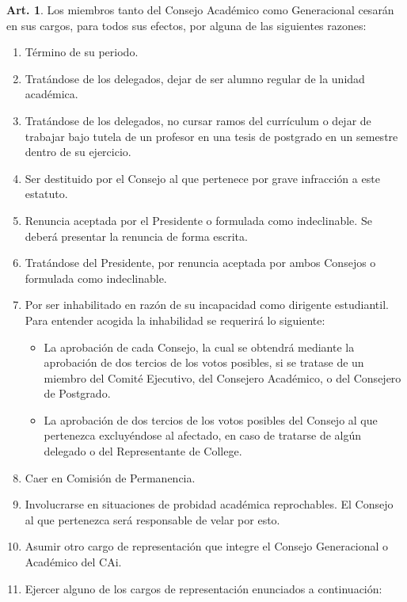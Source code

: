 \documentclass[letterpaper,11pt]{article}
\theoremstyle{definition}%
\newtheorem{art}{Art.} %
\begin{document}
\begin{art}\label{ceseCargo}
	Los miembros tanto del Consejo Académico como Generacional cesarán en sus cargos, para todos sus efectos, por alguna de las siguientes razones:
	\begin{enumerate}
		\item Término de su periodo.
		\item\label{alumno_regular} Tratándose de los delegados, dejar de ser alumno regular de la unidad académica.
		\item\label{sin_ramos} Tratándose de los delegados, no cursar ramos del currículum o dejar de trabajar bajo tutela de un profesor en una tesis de postgrado en un semestre dentro de su ejercicio.
		\item\label{destitucion} Ser destituido por el Consejo al que pertenece por grave infracción a este estatuto.
		\item\label{renuncia} Renuncia aceptada por el Presidente o formulada como indeclinable. Se deberá presentar la renuncia de forma escrita.
		\item Tratándose del Presidente, por renuncia aceptada por ambos Consejos o formulada como indeclinable.
		\item\label{inhabilitacion} Por ser inhabilitado en razón de su incapacidad como dirigente estudiantil. Para entender acogida la inhabilidad se requerirá lo siguiente:
		      \begin{itemize}
			      \item La aprobación de cada Consejo, la cual se obtendrá mediante la aprobación de dos tercios de los votos posibles, si se tratase de un miembro del Comité Ejecutivo, del Consejero Académico, o del Consejero de Postgrado.
			      \item La aprobación de dos tercios de los votos posibles del Consejo al que pertenezca excluyéndose al afectado, en caso de tratarse de algún delegado o del Representante de College.
		      \end{itemize}
		\item\label{permanencia} Caer en Comisión de Permanencia.
		\item Involucrarse en situaciones de probidad académica reprochables. El Consejo al que pertenezca será responsable de velar por esto.
		\item Asumir otro cargo de representación que integre el Consejo Generacional o Académico del CAi.
		\item Ejercer alguno de los cargos de representación enunciados a continuación:
		      \begin{itemize}

\end{itemize}
\end{enumerate}
\end{art}
\end{document}
